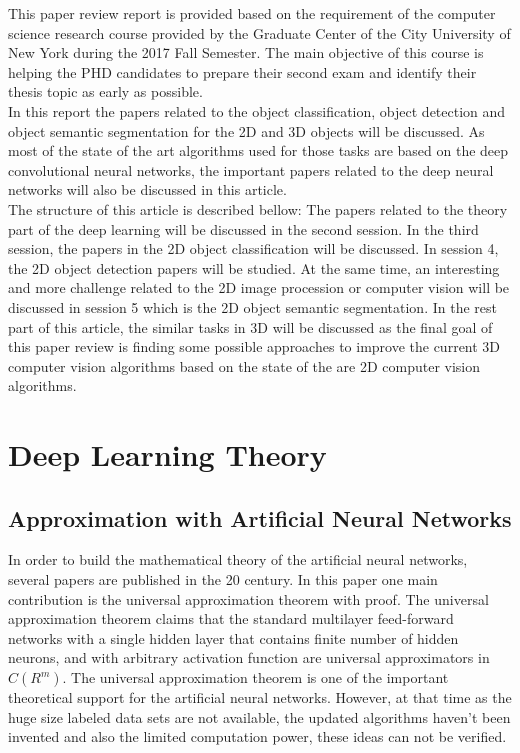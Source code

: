 \documentclass[a4paper,12pt]{article}
\begin{document}
This paper review report is provided based on the requirement of the computer science research course provided by the Graduate Center of the City University of New York during the 2017 Fall Semester. The main objective of this course is helping the PHD candidates to prepare their second exam and identify their thesis topic as early as possible\cite{ji2017}. \\
In this report the papers related to the object classification, object detection and object semantic segmentation for the 2D and 3D objects will be discussed. As most of the state of the art algorithms used for those tasks are based on the deep convolutional neural networks, the important papers related to the deep neural networks will also be discussed in this article.\\
The structure of this article is described bellow: The papers related to the theory part of the deep learning will be discussed in the second session. In the third session, the papers in the 2D object classification will be discussed. In session 4, the 2D object detection papers will be studied. At the same time, an interesting and more challenge related to the 2D image procession or computer vision will be discussed in session 5 which is the 2D object semantic segmentation. In the rest part of this article, the similar tasks in 3D will be discussed as the final goal of this paper review is finding some possible approaches to improve the current 3D computer vision algorithms based on the state of the are 2D computer vision algorithms.\\

\section{Deep Learning Theory}
\subsection{Approximation with Artificial Neural Networks \cite{csaji2001}}
In order to build the mathematical theory of the artificial neural networks, several papers are published in the 20 century. In this paper one main contribution is the universal approximation theorem with proof. The universal approximation theorem claims \cite{csaji2001}  that the standard multilayer feed-forward networks with a single hidden layer that contains finite number of hidden neurons, and with arbitrary activation function are universal approximators in $C(R^m)$.  The universal approximation theorem is one of the important theoretical support for the artificial neural networks. However, at that time as the huge size labeled data sets are not available, the updated algorithms haven't been invented and also the limited computation power, these ideas can not be verified.
\end{document}

